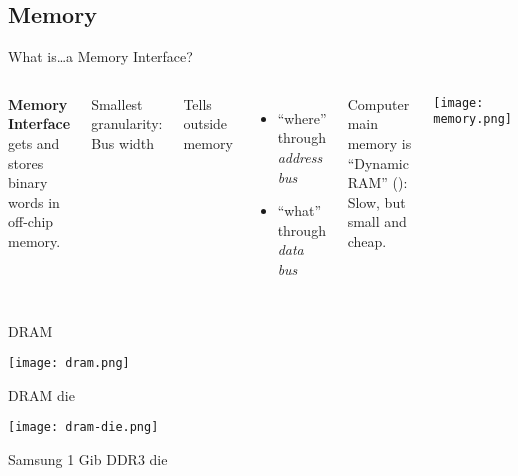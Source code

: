 \documentclass[english,compress]{beamer}
\begin{document}
\subsection{Memory}
\begin{frame}{What is\dots a Memory Interface?}
  \begin{columns}
      \textbf{Memory Interface} gets and stores binary words in
      off-chip memory.
      \medskip

      Smallest granularity: Bus width
      \medskip

      Tells outside memory
      \begin{itemize}
        \item ``where'' through \emph{address bus}
        \item ``what'' through \emph{data bus}
      \end{itemize}

      Computer main memory is ``Dynamic RAM''
      ():
      Slow, but small and cheap.

      \texttt{[image: memory.png]}
  \end{columns}
\end{frame}

\begin{frame}{DRAM}
  \begin{center}
    \texttt{[image: dram.png]}
  \end{center}
\end{frame}
\begin{frame}{DRAM die}
  \begin{center}
    \texttt{[image: dram-die.png]}

    \medskip
    Samsung 1 Gib DDR3 die
  \end{center}
\end{frame}
\end{document}
